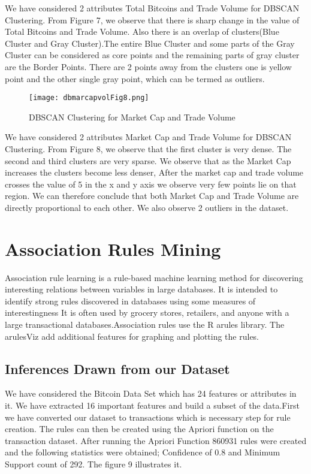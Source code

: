 \documentclass{article}
\begin{document}
We have considered 2 attributes Total Bitcoins and Trade Volume for DBSCAN Clustering. From Figure 7, we observe that there is sharp change in the value of Total Bitcoins and Trade Volume. Also there is an overlap of clusters(Blue Cluster and Gray Cluster).The entire Blue Cluster and some parts of the Gray Cluster can be considered as core points and the remaining parts of gray cluster are the Border Points. There are 2 points away from the clusters one is yellow point and the other single gray point, which can be termed as outliers. \newline

\begin{figure}[h]
    \centering
    \texttt{[image: dbmarcapvolFig8.png]}
    \caption{DBSCAN Clustering for Market Cap and Trade Volume }
    \label{fig:my_label}
\end{figure}


We have considered 2 attributes Market Cap and Trade Volume for DBSCAN Clustering. From Figure 8, we observe that the first cluster is very dense. The second and third clusters are very sparse. We observe that as the Market Cap increases the clusters become less denser, After the market cap and trade volume crosses the value of 5 in the x and y axis we observe very few points lie on that region. We can therefore conclude that both Market Cap and Trade Volume are directly proportional to each other. We also observe 2 outliers in the dataset.

\section {Association Rules Mining}
Association rule learning is a rule-based machine learning method for discovering interesting relations between variables in large databases. It is intended to identify strong rules discovered in databases using some measures of interestingness It is often used by grocery stores, retailers, and anyone with a large transactional databases.Association rules use the R arules library. The arulesViz add additional features for graphing and plotting the rules. 

\subsection{Inferences Drawn from our Dataset}
We have considered the Bitcoin Data Set which has 24 features or attributes in it. We have extracted 16 important features and build a subset of the data.First we have converted our dataset to transactions which is necessary step for rule creation. The rules can then be created using the Apriori function on the transaction dataset. After running the Apriori Function 860931 rules were created and the following statistics were obtained; Confidence of 0.8 and Minimum Support count of 292. The figure 9 illustrates it. \newline
\end{document}
